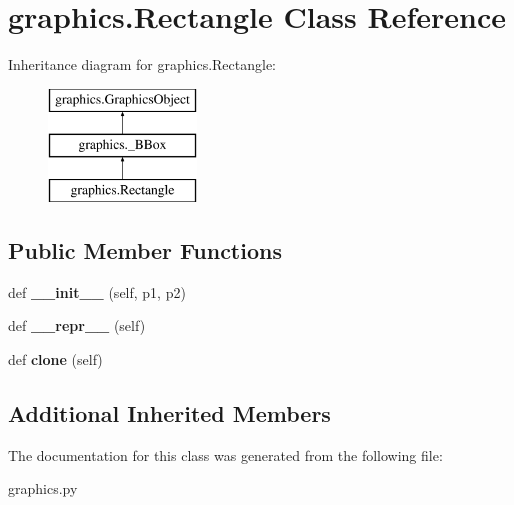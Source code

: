 \hypertarget{classgraphics_1_1_rectangle}{}\section{graphics.\+Rectangle Class Reference}
\label{classgraphics_1_1_rectangle}
Inheritance diagram for graphics.\+Rectangle\+:\begin{figure}[H]
\begin{center}
\leavevmode
\includegraphics[height=3.000000cm]{classgraphics_1_1_rectangle}
\end{center}
\end{figure}
\subsection*{Public Member Functions}
\begin{DoxyCompactItemize}
\item 
\mbox{\label{classgraphics_1_1_rectangle_a691f947134b1fc54443c55aa9d6214c5}} 
def {\bfseries \+\_\+\+\_\+init\+\_\+\+\_\+} (self, p1, p2)
\item 
\mbox{\label{classgraphics_1_1_rectangle_af16c7826cc639912ec3ef819f6ac467e}} 
def {\bfseries \+\_\+\+\_\+repr\+\_\+\+\_\+} (self)
\item 
\mbox{\label{classgraphics_1_1_rectangle_aaffe12a1bc2f5fc5ff221c909d2fb583}} 
def {\bfseries clone} (self)
\end{DoxyCompactItemize}
\subsection*{Additional Inherited Members}


The documentation for this class was generated from the following file\+:\begin{DoxyCompactItemize}
\item 
graphics.\+py\end{DoxyCompactItemize}
